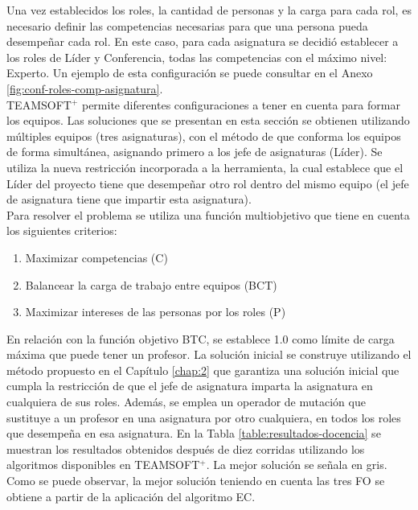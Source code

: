 
Una vez establecidos los roles, la cantidad de personas y la carga para cada rol, es necesario definir las competencias necesarias para que una persona pueda desempeñar cada rol. En este caso, para cada asignatura se decidió establecer a los roles de Líder y Conferencia, todas las competencias con el máximo nivel: Experto. Un ejemplo de esta configuración se puede consultar en el Anexo \ref{fig:conf-roles-comp-asignatura}. \\ 

TEAMSOFT$^+$ permite diferentes configuraciones a tener en cuenta para formar los equipos. Las soluciones que se presentan en esta sección se obtienen utilizando múltiples equipos (tres asignaturas), con el método de que conforma los equipos de forma simultánea, asignando primero a los jefe de asignaturas (Líder). Se utiliza la nueva restricción  incorporada a la herramienta, la cual establece que el Líder del proyecto tiene que desempeñar otro rol dentro del mismo equipo (el jefe de asignatura tiene que impartir esta asignatura). \\


Para resolver el problema se utiliza una función multiobjetivo que tiene en cuenta los siguientes criterios:
\begin{enumerate}
	\setlength\itemsep{0em}
	\item Maximizar competencias (C)
	\item Balancear la carga de trabajo entre equipos (BCT)
	\item Maximizar intereses de las personas por los roles (P)
\end{enumerate}

En relación con la función objetivo BTC, se establece 1.0 como límite de carga máxima que puede tener un profesor. La solución inicial se construye utilizando el método propuesto en el Capítulo \ref{chap:2} que garantiza una solución inicial que cumpla la restricción de que el jefe de asignatura imparta la asignatura en cualquiera de sus roles. Además, se emplea un operador de mutación que sustituye a un profesor en una asignatura por otro cualquiera, en todos los roles que desempeña en esa asignatura. En la Tabla \ref{table:resultados-docencia} se muestran los resultados obtenidos después de diez corridas utilizando los algoritmos disponibles en TEAMSOFT$^+$. La mejor solución se señala en gris. Como se puede observar, la mejor solución teniendo en cuenta las tres FO se obtiene a partir de la aplicación del algoritmo EC.

